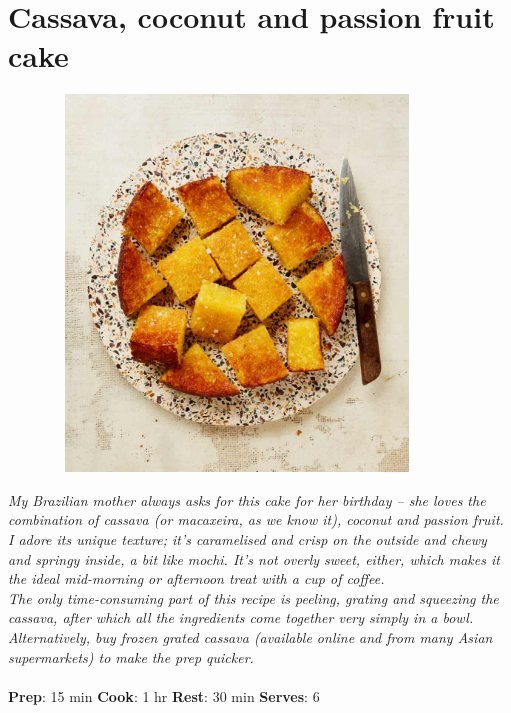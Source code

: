 \documentclass{book}
\begin{document}
\section{Cassava, coconut and passion fruit cake}
\begin{figure}
\centering\includegraphics[width=10cm,height=10cm,keepaspectratio]{Recipe_Pictures/Cassava,_coconut_and_passion_fruit_cake.png}
\end{figure}
\emph{My Brazilian mother always asks for this cake for her birthday – she loves the combination of cassava (or macaxeira, as we know it), coconut and passion fruit. I adore its unique texture; it’s caramelised and crisp on the outside and chewy and springy inside, a bit like mochi. It’s not overly sweet, either, which makes it the ideal mid-morning or afternoon treat with a cup of coffee. \\ 
The only time-consuming part of this recipe is peeling, grating and squeezing the cassava, after which all the ingredients come together very simply in a bowl. Alternatively, buy frozen grated cassava (available online and from many Asian supermarkets) to make the prep quicker.}\\\\ 
\textbf{Prep}: 15 min
\textbf{Cook}: 1 hr
\textbf{Rest}: 30 min
\textbf{Serves}: 6
\end{document}
